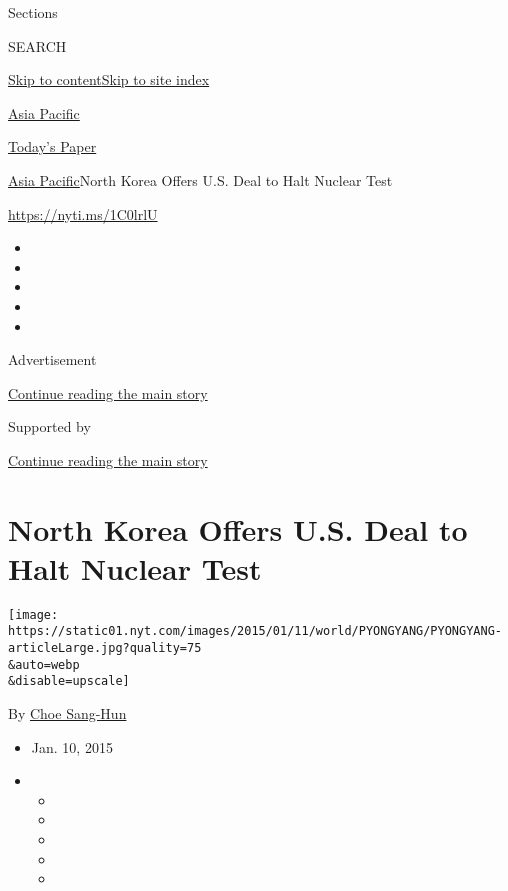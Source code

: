 Sections

SEARCH

\protect\hyperlink{site-content}{Skip to
content}\protect\hyperlink{site-index}{Skip to site index}

\href{https://www.nytimes.com/section/world/asia}{Asia Pacific}

\href{https://myaccount.nytimes.com/auth/login?response_type=cookie\&client_id=vi}{}

\href{https://www.nytimes.com/section/todayspaper}{Today's Paper}

\href{/section/world/asia}{Asia Pacific}\textbar{}North Korea Offers
U.S. Deal to Halt Nuclear Test

\url{https://nyti.ms/1C0lrlU}

\begin{itemize}
\item
\item
\item
\item
\item
\end{itemize}

Advertisement

\protect\hyperlink{after-top}{Continue reading the main story}

Supported by

\protect\hyperlink{after-sponsor}{Continue reading the main story}

\hypertarget{north-korea-offers-us-deal-to-halt-nuclear-test}{%
\section{North Korea Offers U.S. Deal to Halt Nuclear
Test}\label{north-korea-offers-us-deal-to-halt-nuclear-test}}

\texttt{[image: https://static01.nyt.com/images/2015/01/11/world/PYONGYANG/PYONGYANG-articleLarge.jpg?quality=75\\\&auto=webp\\\&disable=upscale]}

By \href{http://www.nytimes.com/by/choe-sang-hun}{Choe Sang-Hun}

\begin{itemize}
\item
  Jan. 10, 2015
\item
  \begin{itemize}
  \item
  \item
  \item
  \item
  \item
  \end{itemize}
\end{itemize}


